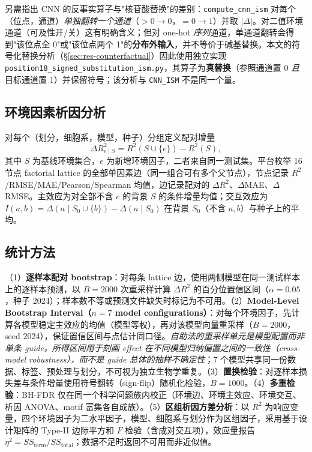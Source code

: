 另需指出 CNN 的反事实算子与"核苷酸替换"的差别：\texttt{compute\_cnn\_ism} 对每个（位点，通道）\emph{单独翻转一个通道}（$>0 \to 0$，$=0 \to 1$）并取 $|\Delta|$。对二值环境通道（可及性开/关）这有明确含义；但对 one-hot \emph{序列}通道，单通道翻转会得到"该位点全 0"或"该位点两个 1"的\textbf{分布外输入}，并不等价于碱基替换。本文的符号化替换分析（\S\ref{sec:res-counterfactual}）因此使用独立实现 \texttt{position18\_signed\_substitution\_ism.py}，其算子为\textbf{真替换}（参照通道置 0 \emph{且}目标通道置 1）并保留符号；该分析与 \texttt{CNN\_ISM} 不是同一个量。

\subsection{环境因素析因分析}

对每个（划分，细胞系，模型，种子）分组定义配对增量
\begin{equation}
\Delta R^{2}_{e \mid S} = R^{2}(S \cup \{e\}) - R^{2}(S),
\end{equation}
其中 $S$ 为基线环境集合，$e$ 为新增环境因子，二者来自同一测试集。平台枚举 16 节点 factorial lattice 的全部单因素边（同一组合可有多个父节点），节点记录 $R^{2}$/RMSE/MAE/Pearson/Spearman 均值，边记录配对的 $\Delta R^{2}$、$\Delta$MAE、$\Delta$RMSE。主效应为对全部不含 $e$ 的背景 $S$ 的条件增量均值；交互效应为 $I(a,b)=\Delta(a\mid S_0\cup\{b\})-\Delta(a\mid S_0)$ 在背景 $S_0$（不含 $a,b$）与种子上的平均。

\subsection{统计方法}
\label{sec:methods-stats}

（1）\textbf{逐样本配对 bootstrap}：对每条 lattice 边，使用两侧模型在同一测试样本上的逐样本预测，以 $B=2000$ 次重采样计算 $\Delta R^{2}$ 的百分位置信区间（$\alpha=0.05$，种子 2024）；样本数不等或预测文件缺失时标记为不可用。（2）\textbf{Model-Level Bootstrap Interval（$n=7$ model configurations）}：对每个环境因子，先计算各模型稳定主效应的均值（模型等权），再对该模型向量重采样（$B=2000$，seed 2024），保证置信区间与点估计同口径。\emph{自助法的重采样单元是模型配置而非单条 guide，所得区间用于刻画 effect 在不同模型归纳偏置之间的一致性（cross-model robustness），而不是 guide 总体的抽样不确定性}；7 个模型共享同一份数据、标签、预处理与划分，不可视为独立生物学重复。（3）\textbf{置换检验}：对逐样本损失差与条件增量使用符号翻转（sign-flip）随机化检验，$B=1000$。（4）\textbf{多重检验}：BH-FDR 仅在同一个科学问题族内校正（环境边、环境主效应、环境交互、析因 ANOVA、motif 富集各自成族）。（5）\textbf{区组析因方差分析}：以 $R^{2}$ 为响应变量，四个环境因子为二水平因子，模型、细胞系与划分作为区组因子，采用基于设计矩阵的 Type-II 边际平方和 $F$ 检验（含成对交互项），效应量报告 $\eta^{2}=SS_{\text{term}}/SS_{\text{total}}$；数据不足时返回不可用而非近似值。

